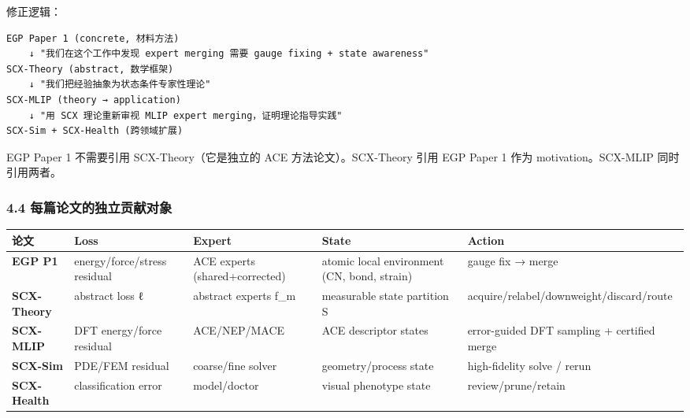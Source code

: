 \documentclass[
  12pt,
]{ctexart}
\begin{document}
修正逻辑：

\begin{verbatim}
EGP Paper 1 (concrete, 材料方法)
    ↓ "我们在这个工作中发现 expert merging 需要 gauge fixing + state awareness"
SCX-Theory (abstract, 数学框架)  
    ↓ "我们把经验抽象为状态条件专家性理论"
SCX-MLIP (theory → application)
    ↓ "用 SCX 理论重新审视 MLIP expert merging，证明理论指导实践"
SCX-Sim + SCX-Health (跨领域扩展)
\end{verbatim}

EGP Paper 1 不需要引用 SCX-Theory（它是独立的 ACE 方法论文）。SCX-Theory
引用 EGP Paper 1 作为 motivation。SCX-MLIP 同时引用两者。

\subsubsection{4.4
每篇论文的独立贡献对象}\label{ux6bcfux7bc7ux8bbaux6587ux7684ux72ecux7acbux8d21ux732eux5bf9ux8c61}

\begin{longtable}[]{@{}
  >{\raggedright\arraybackslash}p{}
  >{\raggedright\arraybackslash}p{}
  >{\raggedright\arraybackslash}p{}
  >{\raggedright\arraybackslash}p{}
  >{\raggedright\arraybackslash}p{}@{}}
\toprule\noalign{}
\begin{minipage}[b]{\linewidth}\raggedright
论文
\end{minipage} & \begin{minipage}[b]{\linewidth}\raggedright
Loss
\end{minipage} & \begin{minipage}[b]{\linewidth}\raggedright
Expert
\end{minipage} & \begin{minipage}[b]{\linewidth}\raggedright
State
\end{minipage} & \begin{minipage}[b]{\linewidth}\raggedright
Action
\end{minipage} \\
\midrule\noalign{}
\endhead
\bottomrule\noalign{}
\endlastfoot
\textbf{EGP P1} & energy/force/stress residual & ACE experts
(shared+corrected) & atomic local environment (CN, bond, strain) & gauge
fix → merge \\
\textbf{SCX-Theory} & abstract loss ℓ & abstract experts f\_m &
measurable state partition S &
acquire/relabel/downweight/discard/route \\
\textbf{SCX-MLIP} & DFT energy/force residual & ACE/NEP/MACE & ACE
descriptor states & error-guided DFT sampling + certified merge \\
\textbf{SCX-Sim} & PDE/FEM residual & coarse/fine solver &
geometry/process state & high-fidelity solve / rerun \\
\textbf{SCX-Health} & classification error & model/doctor & visual
phenotype state & review/prune/retain \\
\end{longtable}
\end{document}
